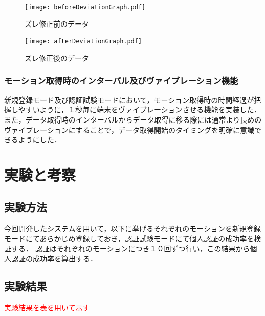 \documentclass[11pt]{jreport}
\begin{document}
        \begin{figure}[htbp]
            \begin{minipage}{0.5\hsize}
                \begin{center}
                    \texttt{[image: beforeDeviationGraph.pdf]}
                \end{center}
                \caption{ズレ修正前のデータ}
                \label{beforeDeviationDataGraph}
            \end{minipage}
            \begin{minipage}{0.5\hsize}
                \begin{center}
                    \texttt{[image: afterDeviationGraph.pdf]}
                \end{center}
                \caption{ズレ修正後のデータ}
                \label{afterDeviationDataGraph}
            \end{minipage}
        \end{figure}

        \subsection{モーション取得時のインターバル及びヴァイブレーション機能}
        新規登録モード及び認証試験モードにおいて，モーション取得時の時間経過が把握しやすいように，１秒毎に端末をヴァイブレーションさせる機能を実装した．
        また，データ取得時のインターバルからデータ取得に移る際には通常より長めのヴァイブレーションにすることで，データ取得開始のタイミングを明確に意識できるようにした．

\chapter{実験と考察}
	\section{実験方法}
	今回開発したシステムを用いて，以下に挙げるそれぞれのモーションを新規登録モードにてあらかじめ登録しておき，認証試験モードにて個人認証の成功率を検証する．
    認証はそれぞれのモーションにつき１０回ずつ行い，この結果から個人認証の成功率を算出する．

	\section{実験結果}
	\textcolor{red}{実験結果を表を用いて示す}
\end{document}
